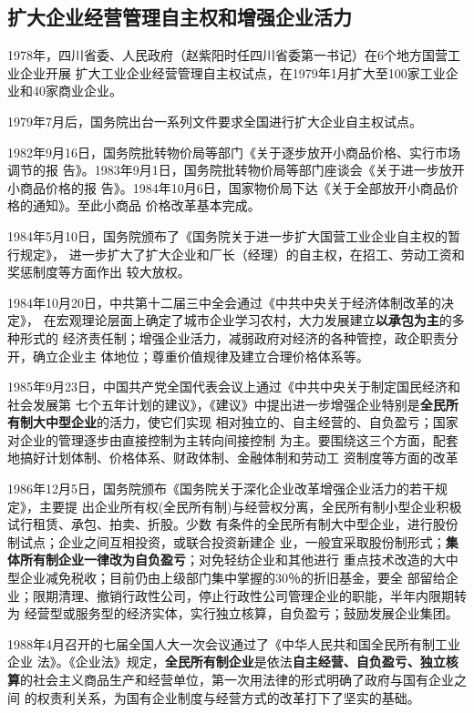 
\subsection{扩大企业经营管理自主权和增强企业活力}

1978年，四川省委、人民政府（赵紫阳时任四川省委第一书记）在6个地方国营工业企业开展
扩大工业企业经营管理自主权试点，在1979年1月扩大至100家工业企业和40家商业企业。

1979年7月后，国务院出台一系列文件要求全国进行扩大企业自主权试点。

1982年9月16日，国务院批转物价局等部门《关于逐步放开小商品价格、实行市场调节的报
告》。1983年9月1日，国务院批转物价局等部门座谈会《关于进一步放开小商品价格的报
告》。1984年10月6日，国家物价局下达《关于全部放开小商品价格的通知》。至此小商品
价格改革基本完成。


1984年5月10日，国务院颁布了《国务院关于进一步扩大国营工业企业自主权的暂行规定》，
进一步扩大了扩大企业和厂长（经理）的自主权，在招工、劳动工资和奖惩制度等方面作出
较大放权。

1984年10月20日，中共第十二届三中全会通过《中共中央关于经济体制改革的决定》，
在宏观理论层面上确定了城市企业学习农村，大力发展建立\textbf{以承包为主}的多种形式的
经济责任制；增强企业活力，减弱政府对经济的各种管控，政企职责分开，确立企业主
体地位；尊重价值规律及建立合理价格体系等。

1985年9月23日，中国共产党全国代表会议上通过《中共中央关于制定国民经济和社会发展第
七个五年计划的建议》，《建议》中提出进一步增强企业特别是\textbf{全民所有制大中型企业}的活力，使它们实现
相对独立的、自主经营的、自负盈亏；国家对企业的管理逐步由直接控制为主转向间接控制
为主。要围绕这三个方面，配套地搞好计划体制、价格体系、财政体制、金融体制和劳动工
资制度等方面的改革

1986年12月5日，国务院颁布《国务院关于深化企业改革增强企业活力的若干规定》，主要提
出企业所有权(全民所有制)与经营权分离，全民所有制小型企业积极试行租赁、承包、拍卖、折股。少数
有条件的全民所有制大中型企业，进行股份制试点；企业之间互相投资，或联合投资新建企
业，一般宜采取股份制形式；\textbf{集体所有制企业一律改为自负盈亏}；对免轻纺企业和其他进行
重点技术改造的大中型企业减免税收；目前仍由上级部门集中掌握的30％的折旧基金，要全
部留给企业；限期清理、撤销行政性公司，停止行政性公司管理企业的职能，半年内限期转为
经营型或服务型的经济实体，实行独立核算，自负盈亏；鼓励发展企业集团。

1988年4月召开的七届全国人大一次会议通过了《中华人民共和国全民所有制工业企业
法》。《企业法》规定，\textbf{全民所有制企业}是依法\textbf{自主经营、自负盈亏、独立核
  算}的社会主义商品生产和经营单位，第一次用法律的形式明确了政府与国有企业之间
的权责利关系，为国有企业制度与经营方式的改革打下了坚实的基础。

